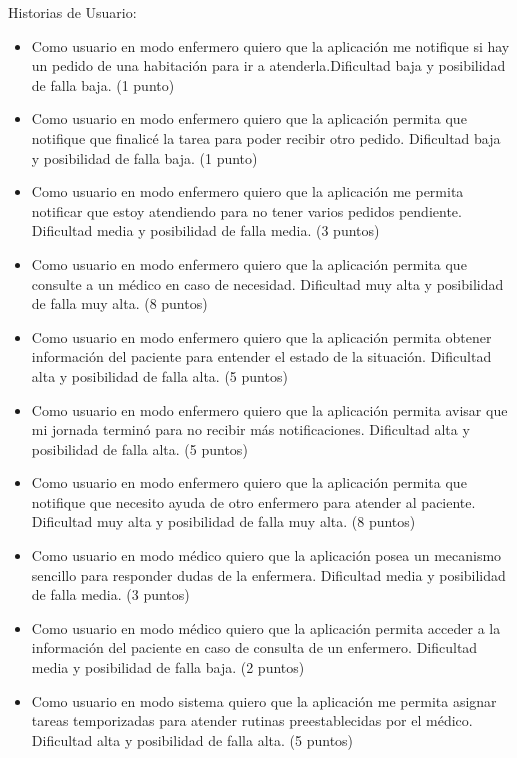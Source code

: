 \documentclass[
11pt, %
]{charter}
\begin{document}
Historias de Usuario:

\begin{itemize}
\item Como usuario en modo enfermero quiero que la aplicación me notifique si hay un pedido de una habitación para ir a atenderla.Dificultad baja y posibilidad de falla  baja. (1 punto)

\item Como usuario en modo enfermero quiero que la aplicación permita que notifique que finalicé la tarea para poder recibir otro pedido. Dificultad baja y posibilidad de falla  baja. (1 punto)

\item Como usuario en modo enfermero quiero que la aplicación me permita notificar que estoy atendiendo para no tener varios pedidos pendiente. Dificultad media y posibilidad de falla media. (3 puntos)

\item Como usuario en modo enfermero quiero que la aplicación permita que consulte a un médico en caso de necesidad. Dificultad muy alta y posibilidad de falla muy alta. (8 puntos)

\item Como usuario en modo enfermero quiero que la aplicación permita obtener información del paciente para entender el estado de la situación. Dificultad alta y posibilidad de falla alta. (5 puntos)

\item Como usuario en modo enfermero quiero que la aplicación permita avisar que mi jornada terminó para no recibir más notificaciones. Dificultad alta y posibilidad de falla alta. (5 puntos)

\item Como usuario en modo enfermero quiero que la aplicación permita que notifique que necesito ayuda de otro enfermero para atender al paciente. Dificultad muy alta y posibilidad de falla muy alta. (8 puntos)

\item Como usuario en modo médico quiero que la aplicación posea un mecanismo sencillo para responder dudas de la enfermera. Dificultad media y posibilidad de falla media. (3 puntos)

\item Como usuario en modo médico quiero que la aplicación permita acceder a la información del paciente en caso de consulta de un enfermero. Dificultad media y posibilidad de falla baja. (2 puntos)

\item Como usuario en modo sistema quiero que la aplicación me permita asignar tareas temporizadas para atender rutinas preestablecidas por el médico. Dificultad alta y posibilidad de falla alta. (5 puntos)


\end{itemize}
\end{document}
